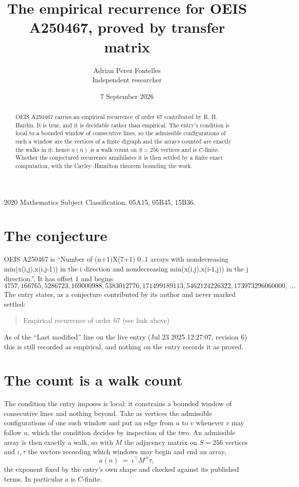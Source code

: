 \documentclass[11pt,a4paper]{article}
\title{The empirical recurrence for OEIS A250467, proved by transfer matrix}
\author{Adrian Perez Fontelles\\ \small Independent researcher}
\date{7 September 2026}
\theoremstyle{plain}
\theoremstyle{definition}
\begin{document}
\maketitle

\begin{abstract}
OEIS A250467 carries an empirical recurrence of order $67$ contributed by R. H. Hardin. It is
true, and it is decidable rather than empirical. The entry's condition is local to a bounded window of consecutive lines, so
the admissible configurations of such a window are the vertices of a finite digraph and the
arrays counted are exactly the walks in it; hence $a(n)$ is a walk count on $S=256$ vertices
and is $C$-finite. Whether the conjectured recurrence annihilates it is then settled by a
finite exact computation, with the Cayley--Hamilton theorem bounding the work.
\end{abstract}

\noindent\small 2020 Mathematics Subject Classification. 05A15, 05B45, 15B36.\normalsize

\section{The conjecture}

OEIS A250467 is ``Number of (n+1)X(7+1) 0..1 arrays with nondecreasing min(x(i,j),x(i,j-1)) in the i direction and nondecreasing min(x(i,j),x(i-1,j)) in the j direction.''. It has offset $1$ and begins
\[
4757, 166765, 5286723, 169000988, 5383012776, 171499189113, 5462124226322, 173973296060000,\ \dots
\]
The entry states, as a conjecture contributed by its author and never marked settled:
\begin{quote}
Empirical recurrence of order 67 (see link above)
\end{quote}
As of the ``Last modified'' line on the live entry (Jul 23 2025 12:27:07, revision 6) this is still
recorded as empirical, and nothing on the entry records it as proved.

\section{The count is a walk count}

The condition the entry imposes is local: it constrains a bounded window of consecutive lines and nothing beyond. Take as
vertices the admissible configurations of one such window and put an edge from $u$ to $v$
whenever $v$ may follow $u$, which the condition decides by inspection of the two. An
admissible array is then exactly a walk, so with $M$ the adjacency matrix on $S=256$ vertices
and $\iota,\tau$ the vectors recording which windows may begin and end an array,
\[
a(n)\;=\;\iota^{\!\top}M^{\,n}\tau ,
\]
the exponent fixed by the entry's own shape and checked against its published terms. In
particular $a$ is $C$-finite.
\end{document}
